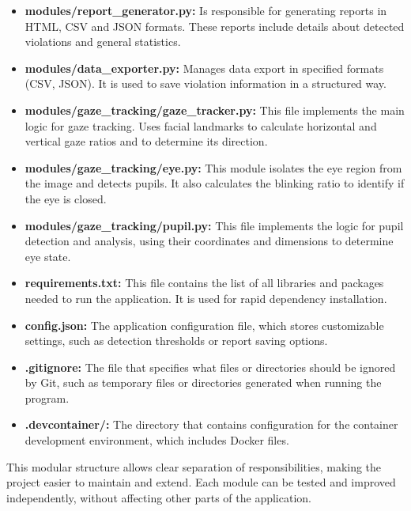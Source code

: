 \documentclass[12pt,a4paper]{article}
\begin{document}
\begin{itemize}
    \item \textbf{modules/report\_generator.py:} Is responsible for generating reports in HTML, CSV and JSON formats. These reports include details about detected violations and general statistics.

    \item \textbf{modules/data\_exporter.py:} Manages data export in specified formats (CSV, JSON). It is used to save violation information in a structured way.
    
    \item \textbf{modules/gaze\_tracking/gaze\_tracker.py:} This file implements the main logic for gaze tracking. Uses facial landmarks to calculate horizontal and vertical gaze ratios and to determine its direction.

    \item \textbf{modules/gaze\_tracking/eye.py:} This module isolates the eye region from the image and detects pupils. It also calculates the blinking ratio to identify if the eye is closed.

    \item \textbf{modules/gaze\_tracking/pupil.py:} This file implements the logic for pupil detection and analysis, using their coordinates and dimensions to determine eye state.

    \item \textbf{requirements.txt:} This file contains the list of all libraries and packages needed to run the application. It is used for rapid dependency installation.

    \item \textbf{config.json:} The application configuration file, which stores customizable settings, such as detection thresholds or report saving options.

    \item \textbf{.gitignore:} The file that specifies what files or directories should be ignored by Git, such as temporary files or directories generated when running the program.

    \item \textbf{.devcontainer/:} The directory that contains configuration for the container development environment, which includes Docker files.
\end{itemize}

This modular structure allows clear separation of responsibilities, making the project easier to maintain and extend. Each module can be tested and improved independently, without affecting other parts of the application.
\end{document}

